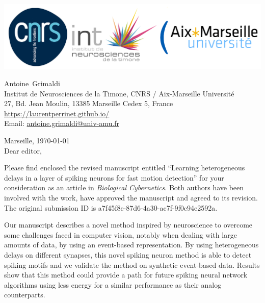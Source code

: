 \documentclass[10pt,english]{article}
\makeatletter
\newcommand{\LastName}{Grimaldi}%
\newcommand{\FirstName}{Antoine}%
\newcommand{\Institute}{Institut de Neurosciences de la Timone, CNRS / Aix-Marseille Universit\'e}%
\newcommand{\Address}{27, Bd. Jean Moulin, 13385 Marseille Cedex 5, France}%
\newcommand{\Website}{\url{https://laurentperrinet.github.io/}}%
\newcommand{\Email}{\url{antoine.grimaldi@univ-amu.fr}}%
\makeatother
\begin{document}
\includegraphics[width=.4\textwidth]{troislogos.png}
\\
\vspace{.1\baselineskip}
\hrulefill
\vspace{.1\baselineskip}

\begin{flushright}
	\FirstName\  \LastName\  \\
	\Institute\\[6pt]
	\Address\\%
	\Website \\
	  Email: \Email \\[6pt]
\end{flushright}
\justifying
\vspace{1\baselineskip}
Marseille, 
\today
\\[12pt] %
	
Dear editor,

Please find enclosed the revised manuscript entitled ``Learning heterogeneous delays in a layer of spiking neurons for fast motion detection'' for your consideration as an article in \emph{Biological Cybernetics}. Both authors have been involved with the work, have approved the manuscript and agreed to its revision. The original submission ID is a7f45f8e-87d6-4a30-ac7f-9f0c94e2592a. 

Our manuscript describes a novel method inspired by neuroscience to overcome some challenges faced in computer vision, notably when dealing with large amounts of data, by using an event-based representation. By using heterogeneous delays on different synapses, this novel spiking neuron method is able to detect spiking motifs and we validate the method on synthetic event-based data. Results show that this method could provide a path for future spiking neural network algorithms using less energy for a similar performance as their analog counterparts. 
\end{document}
